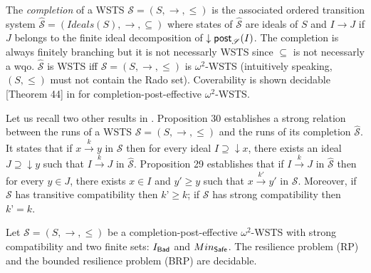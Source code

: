 
The \emph{completion}  \cite{BFM-ic17} of a WSTS $\mathscr{S}=(S,\rightarrow, \leq)$ is the associated ordered transition system $\hat{\mathscr{S}}=(Ideals(S),\rightarrow, \subseteq)$ where states of $\hat{\mathscr{S}}$ are ideals of $S$ and $I \rightarrow J$ if $J$ belongs to the finite ideal decomposition of $\downarrow \textsf{post}_{\mathscr{S}}(I)$. The completion is always finitely branching but it is not necessarly WSTS since $\subseteq$ is not necessarly a wqo. $\hat{\mathscr{S}}$ is WSTS iff $\mathscr{S}=(S,\rightarrow, \leq)$ is $\omega^2$-WSTS (intuitively speaking, $(S,\leq)$ must not contain the Rado set). Coverability is shown decidable  [Theorem 44] in \cite{BFM-ic17} for completion-post-effective $\omega^2$-WSTS.

Let us recall two other results in \cite{BFM-ic17}. Proposition 30 establishes a strong relation between the runs of a WSTS $\mathscr{S}=(S,\rightarrow, \leq)$ and the runs of its completion $\hat{\mathscr{S}}$. It states that if $x \xrightarrow{k} y$ in $\mathscr{S}$ then for every ideal $I \supseteq \downarrow x$, there exists an ideal $J \supseteq \downarrow y$ such that $I \xrightarrow{k} J$ in $\hat{\mathscr{S}}$. Proposition 29 establishes that if $I \xrightarrow{k} J$ in $\hat{\mathscr{S}}$ then for every $y \in J$, there exists $x \in I$ and $y' \geq y$ such that $x \xrightarrow{k'} y'$ in $\mathscr{S}$. Moreover, if $\mathscr{S}$ has transitive compatibility then $k’ \geq k$; if $\mathscr{S}$ has strong compatibility then $k’ = k$.


\begin{proposition}\label{down-up}
Let $\mathscr{S}=(S,\rightarrow, \leq)$ be a completion-post-effective $\omega^2$-WSTS with strong compatibility and two finite sets: $I_{\textsf{Bad}}$ and $Min_{\textsf{Safe}}$.
The %
resilience problem (RP) and the %
bounded resilience problem (BRP) are decidable.
\end{proposition}

